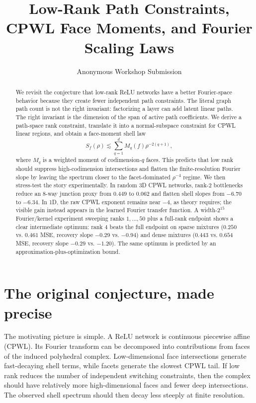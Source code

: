 \documentclass[10pt,twocolumn]{article}
\title{Low-Rank Path Constraints, CPWL Face Moments, and Fourier Scaling Laws}
\author{Anonymous Workshop Submission}
\date{}
\newcommand{\1}{\mathbf{1}}
\begin{document}
\maketitle
\vspace{-2.0em}

\begin{abstract}
We revisit the conjecture that low-rank ReLU networks have a better Fourier-space behavior because they create fewer independent path constraints.  The literal graph path count is not the right invariant: factorizing a layer can add latent linear paths.  The right invariant is the dimension of the span of active path coefficients.  We derive a path-space rank constraint, translate it into a normal-subspace constraint for CPWL linear regions, and obtain a face-moment shell law
\[
S_f(\rho)\lesssim \sum_{q=1}^d M_q(f)\rho^{-2(q+1)},
\]
where $M_q$ is a weighted moment of codimension-$q$ faces.  This predicts that low rank should suppress high-codimension intersections and flatten the finite-resolution Fourier slope by leaving the spectrum closer to the facet-dominated $\rho^{-4}$ regime.  We then stress-test the story experimentally.  In random 3D CPWL networks, rank-$2$ bottlenecks reduce an 8-way junction proxy from $0.449$ to $0.062$ and flatten shell slopes from $-6.70$ to $-6.34$.  In 1D, the raw CPWL exponent remains near $-4$, as theory requires; the visible gain instead appears in the learned Fourier transfer function.  A width-$2^{15}$ Fourier/kernel experiment sweeping ranks $1,\ldots,50$ plus a full-rank endpoint shows a clear intermediate optimum: rank $4$ beats the full endpoint on sparse mixtures ($0.250$ vs. $0.461$ MSE, recovery slope $-0.29$ vs. $-0.94$) and dense mixtures ($0.443$ vs. $0.654$ MSE, recovery slope $-0.29$ vs. $-1.20$).  The same optimum is predicted by an approximation-plus-optimization bound.
\end{abstract}

\section{The original conjecture, made precise}
The motivating picture is simple.  A ReLU network is continuous piecewise affine (CPWL).  Its Fourier transform can be decomposed into contributions from faces of the induced polyhedral complex.  Low-dimensional face intersections generate fast-decaying shell terms, while facets generate the slowest CPWL tail.  If low rank reduces the number of independent switching constraints, then the complex should have relatively more high-dimensional faces and fewer deep intersections.  The observed shell spectrum should then decay less steeply at finite resolution.
\end{document}
